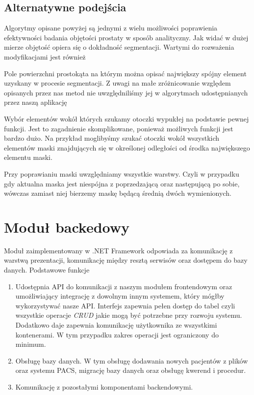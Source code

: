 \documentclass[a4paper,11pt,twoside]{report}
\theoremstyle{definition}
\begin{document}
\subsection{Alternatywne podejścia}
Algorytmy opisane powyżej są jednymi z wielu możliwości poprawienia efektywności badania objętości prostaty w sposób analityczny. Jak widać w dużej mierze objętość opiera się o dokładność segmentacji. Wartymi do rozważenia modyfikacjami jest również
\begin{description}
\item Pole powierzchni prostokąta na którym można opisać największy spójny element uzyskany w procesie segmentacji. Z uwagi na małe zróżnicowanie względem opisanych przez nas metod nie uwzględniliśmy jej w algorytmach udostępnianych przez naszą aplikację
\item Wybór elementów wokół których szukamy otoczki wypukłej na podstawie pewnej funkcji. Jest to zagadnienie skomplikowane, ponieważ możliwych funkcji jest bardzo dużo. Na przykład moglibyśmy szukać otoczki wokół wszystkich elementów maski znajdujących się w określonej odległości od środka największego elementu maski.
\item Przy poprawianiu maski uwzględniamy wszystkie warstwy. Czyli w przypadku gdy aktualna maska jest niespójna z poprzedzającą oraz następującą po sobie, wówczas zamiast niej bierzemy maskę będącą średnią dwóch wymienionych.
\end{description}

\section{Moduł backedowy}

Moduł zaimplementowany w .NET Framework odpowiada za komunikację z warstwą prezentacji, komunikację między resztą serwisów oraz dostępem do bazy danych. Podstawowe funkcje
\begin{enumerate}
\item Udostępnia API do komunikacji z naszym modułem frontendowym oraz umożliwiający integrację z dowolnym innym systemem, który mógłby wykorzystywać nasze API. Interfejs zapewnia pełen dostęp do tabel czyli wszystkie operacje \textit{CRUD} jakie mogą być potrzebne przy rozwoju systemu. Dodatkowo daje zapewnia komunikację użytkownika ze wszystkimi kontenerami. W tym przypadku zakres operacji jest ograniczony do minimum.
\item Obsługę bazy danych. W tym obsługę dodawania nowych pacjentów z plików oraz systemu PACS, migrację bazy danych oraz obsługę kwerend i procedur.
\item Komunikację z pozostałymi komponentami backendowymi.
\end{enumerate}
\end{document}
